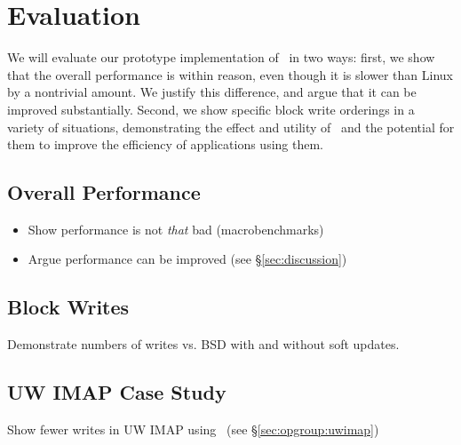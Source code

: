 \section {Evaluation}
\label{sec:evaluation}

We will evaluate our prototype implementation of \Kudos\ in two ways: first, we
show that the overall performance is within reason, even though it is slower
than Linux by a nontrivial amount. We justify this difference, and argue that it
can be improved substantially. Second, we show specific block write orderings in
a variety of situations, demonstrating the effect and utility of \opgroups\ and
the potential for them to improve the efficiency of applications using them.

\subsection {Overall Performance}
\begin{itemize}
\item Show performance is not \emph{that} bad (macrobenchmarks)
\item Argue performance can be improved (see \S\ref{sec:discussion})
\end{itemize}

\subsection {Block Writes}
Demonstrate numbers of writes vs. BSD with and without soft updates.

\subsection {UW IMAP Case Study}
\label{sec:evaluation:uwimap}

Show fewer writes in UW IMAP using \opgroups\ (see \S\ref{sec:opgroup:uwimap})
